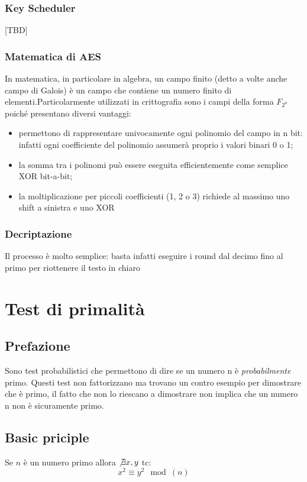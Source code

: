\documentclass[10pt,a4paper]{article}
\begin{document}
\subsubsection{Key Scheduler}
[TBD]
\subsubsection{Matematica di AES}
In matematica, in particolare in algebra, un campo finito (detto a volte anche campo di Galois) è un campo che contiene un numero finito di elementi.Particolarmente utilizzati in crittografia sono i campi della forma $F_{2^n}$ poiché presentano diversi vantaggi:
\begin{itemize}
\item permettono di rappresentare univocamente ogni polinomio del campo in n bit: infatti ogni coefficiente del polinomio assumerà proprio i valori binari 0 o 1;
\item la somma tra i polinomi può essere eseguita efficientemente come semplice XOR bit-a-bit;
\item la moltiplicazione per piccoli coefficienti (1, 2 o 3) richiede al massimo uno shift a sinistra e uno XOR
\end{itemize}

\subsubsection{Decriptazione}
Il processo è molto semplice: basta infatti eseguire i round dal decimo fino al primo per riottenere il testo in chiaro

\section{Test di primalità}
\subsection{Prefazione}
Sono test probabilistici che permettono di dire se un numero n è \textit{probabilmente} primo. Questi test non fattorizzano ma trovano un contro esempio per dimostrare che è primo, il fatto che non lo riescano a dimostrare non implica che un numero n non è sicuramente primo.

\subsection{Basic priciple}
Se $n$ è un numero primo allora $\not \exists x,y$ tc:
$$x^2\equiv y^2 \mod(n)$$
\end{document}
